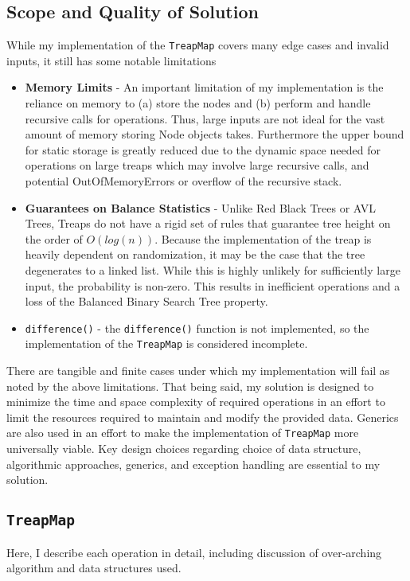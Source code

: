\documentclass[11pt]{article}
\def\tt{\texttt}
\def\TM{\tt{TreapMap}}
\begin{document}
\subsection{Scope and Quality of Solution}
While my implementation of the \TM{} covers many edge cases and invalid inputs, it still has some notable limitations
\begin{itemize}
	\item \textbf{Memory Limits} - An important limitation of my implementation is the reliance on memory to (a) store the nodes and (b) perform and handle recursive calls for operations. Thus, large inputs are not ideal for the vast amount of memory storing Node objects takes. Furthermore the upper bound for static storage is greatly reduced due to the dynamic space needed for operations on large treaps which may involve large recursive calls, and potential OutOfMemoryErrors or overflow of the recursive stack.
	\item \textbf{Guarantees on Balance Statistics} - Unlike Red Black Trees or AVL Trees, Treaps do not have a rigid set of rules that guarantee tree height on the order of $O(log (n))$. Because the implementation of the treap is heavily dependent on randomization, it may be the case that the tree degenerates to a linked list. While this is highly unlikely for sufficiently large input, the probability is non-zero. This results in inefficient operations and a loss of the Balanced Binary Search Tree property. 
	\item \tt{difference()} - the \tt{difference()} function is not implemented, so the implementation of the \TM{} is considered incomplete.
\end{itemize}
 There are tangible and finite cases under which my implementation will fail as noted by the above limitations. That being said, my solution is designed to minimize the time and space complexity of required operations in an effort to limit the resources required to maintain and modify the provided data. Generics are also used in an effort to make the implementation of \TM{} more universally viable. Key design choices regarding choice of data structure, algorithmic approaches, generics, and exception handling are essential to my solution.
 
\subsection{\TM}
Here, I describe each operation in detail, including discussion of over-arching algorithm and data structures used. 
\end{document}
